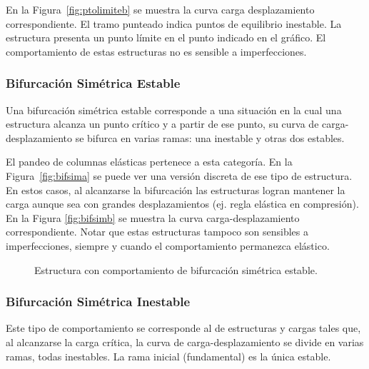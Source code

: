 En la Figura~\ref{fig:ptolimiteb} se muestra la curva carga desplazamiento correspondiente. %
%
El tramo punteado indica puntos de equilibrio inestable.  %
%
La estructura presenta un punto límite en el punto indicado en el gráfico. %
%
El comportamiento de estas estructuras no es sensible a imperfecciones.
%

\subsubsection{Bifurcación Simétrica Estable}

Una bifurcación simétrica estable corresponde a una situación en la cual una estructura alcanza un punto crítico y a partir de ese punto, su curva de carga-desplazamiento se bifurca en varias ramas: una inestable y otras dos estables. %

El pandeo de columnas elásticas pertenece a esta categoría. %
%
En la Figura~\ref{fig:bifsima} se puede ver una versión discreta de ese tipo de estructura. En estos casos, al alcanzarse la bifurcación las estructuras logran mantener la carga aunque sea con grandes desplazamientos (ej. regla elástica en compresión). %
%
En la Figura \ref{fig:bifsimb} se muestra la curva carga-desplazamiento correspondiente. %
%
Notar que estas estructuras tampoco son sensibles a imperfecciones, siempre y cuando el comportamiento permanezca elástico.

\begin{figure}[htb]
	\centering
\hspace{0.05\textwidth}
	\caption{Estructura con comportamiento de bifurcación simétrica estable.}
	\label{fig:fig10}
\end{figure}



\subsubsection{Bifurcación Simétrica Inestable}

Este tipo de comportamiento se corresponde al de estructuras y cargas tales que, al alcanzarse la carga crítica, la curva de carga-desplazamiento se divide en varias ramas, todas inestables. %
%
La rama inicial (fundamental) es la única estable. %

